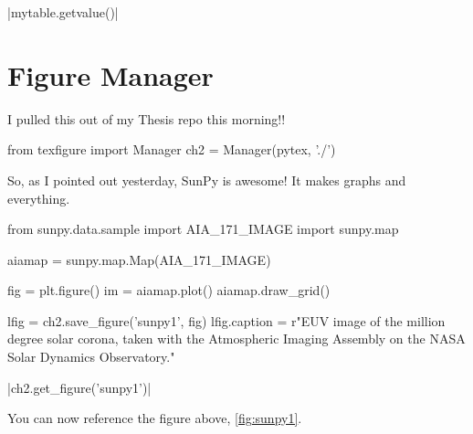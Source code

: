 \documentclass[]{article}
\begin{document}
\py|mytable.getvalue()|


\section{Figure Manager}

I pulled this out of my Thesis repo this morning!!

\begin{pycode}[chapter2]
from texfigure import Manager
ch2 = Manager(pytex, './')
\end{pycode}

So, as I pointed out yesterday, SunPy is awesome! It makes graphs and everything.

\begin{pycode}[chapter2]
from sunpy.data.sample import AIA_171_IMAGE
import sunpy.map

aiamap = sunpy.map.Map(AIA_171_IMAGE)

fig = plt.figure()
im = aiamap.plot()
aiamap.draw_grid()

lfig = ch2.save_figure('sunpy1', fig)
lfig.caption = r"EUV image of the million degree solar corona, taken with the Atmospheric Imaging Assembly on the NASA Solar Dynamics Observatory."
\end{pycode}

\py[chapter2]|ch2.get_figure('sunpy1')|

You can now reference the figure above, \ref{fig:sunpy1}.
\end{document}
